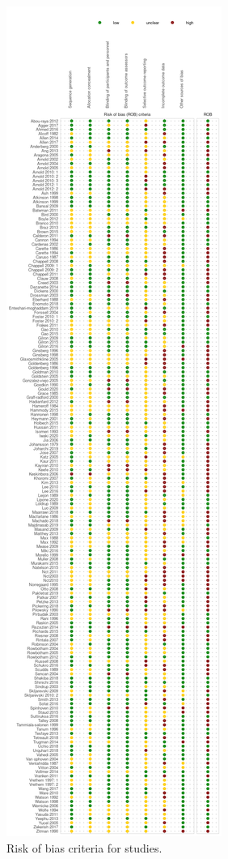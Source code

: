 \documentclass{report}\usepackage[]{graphicx}\usepackage[]{color}
\begin{document}
\begin{figure}
\includegraphics{img/rob-grid.png}
\caption{Risk of bias criteria for studies.}
\label{fig:rob-grid}
\end{figure}
\end{document}
